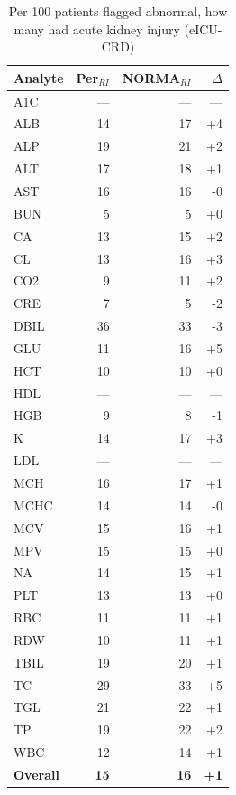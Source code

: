 \begin{table}[ht]
\centering
\footnotesize
\caption{Per 100 patients flagged abnormal, how many had acute kidney injury (eICU-CRD)}
\begin{tabular}{lrrr}
\toprule
Analyte & Per$_{RI}$ & NORMA$_{RI}$ & $\Delta$ \\
\midrule
A1C & --- & --- & --- \\
ALB & 14 & 17 & +4 \\
ALP & 19 & 21 & +2 \\
ALT & 17 & 18 & +1 \\
AST & 16 & 16 & -0 \\
BUN & 5 & 5 & +0 \\
CA & 13 & 15 & +2 \\
CL & 13 & 16 & +3 \\
CO2 & 9 & 11 & +2 \\
CRE & 7 & 5 & -2 \\
DBIL & 36 & 33 & -3 \\
GLU & 11 & 16 & +5 \\
HCT & 10 & 10 & +0 \\
HDL & --- & --- & --- \\
HGB & 9 & 8 & -1 \\
K & 14 & 17 & +3 \\
LDL & --- & --- & --- \\
MCH & 16 & 17 & +1 \\
MCHC & 14 & 14 & -0 \\
MCV & 15 & 16 & +1 \\
MPV & 15 & 15 & +0 \\
NA & 14 & 15 & +1 \\
PLT & 13 & 13 & +0 \\
RBC & 11 & 11 & +1 \\
RDW & 10 & 11 & +1 \\
TBIL & 19 & 20 & +1 \\
TC & 29 & 33 & +5 \\
TGL & 21 & 22 & +1 \\
TP & 19 & 22 & +2 \\
WBC & 12 & 14 & +1 \\
\midrule
\textbf{Overall} & \textbf{15} & \textbf{16} & \textbf{+1} \\
\bottomrule
\end{tabular}
\end{table}